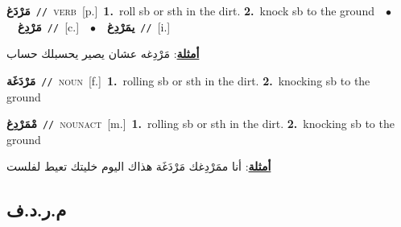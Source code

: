 \documentclass[10pt,a4paper,twoside]{article} %
\begin{document}
\begin{multicols}{2}
{\setlength\topsep{0pt}\textbf{\foreignlanguage{arabic}{مَرْدَغ}}\ {\color{gray}\texttt{//}\color{black}}\ \textsc{verb}\ [p.]\ \textbf{1.}~roll sb or sth in the dirt.  \textbf{2.}~knock sb to the ground\ \ $\bullet$\ \ \setlength\topsep{0pt}\textbf{\foreignlanguage{arabic}{مَرْدِغ}}\ {\color{gray}\texttt{//}\color{black}}\ [c.]\ \ $\bullet$\ \ \setlength\topsep{0pt}\textbf{\foreignlanguage{arabic}{يمَرْدِغ}}\ {\color{gray}\texttt{//}\color{black}}\ [i.]\  \begin{flushright}\color{gray}\foreignlanguage{arabic}{\textbf{\underline{\foreignlanguage{arabic}{أمثلة}}}: مَرْدِغه عشان يصير يحسبلك حساب}\end{flushright}\color{black}} \vspace{2mm}

{\setlength\topsep{0pt}\textbf{\foreignlanguage{arabic}{مَرْدَغَة}}\ {\color{gray}\texttt{//}\color{black}}\ \textsc{noun}\ [f.]\ \textbf{1.}~rolling sb or sth in the dirt.  \textbf{2.}~knocking sb to the ground\ } \vspace{2mm}

{\setlength\topsep{0pt}\textbf{\foreignlanguage{arabic}{مْمَرْدِغ}}\ {\color{gray}\texttt{//}\color{black}}\ \textsc{noun\textunderscore act}\ [m.]\ \textbf{1.}~rolling sb or sth in the dirt.  \textbf{2.}~knocking sb to the ground\  \begin{flushright}\color{gray}\foreignlanguage{arabic}{\textbf{\underline{\foreignlanguage{arabic}{أمثلة}}}: أنا ممَرْدِغك مَرْدَغَة هذاك اليوم خليتك تعيط لفلست}\end{flushright}\color{black}} \vspace{2mm}

\vspace{-3mm}
\subsection*{\color{blue}\foreignlanguage{arabic}{م.ر.د.ف}\color{blue}{}} 


\end{multicols}
\end{document}
